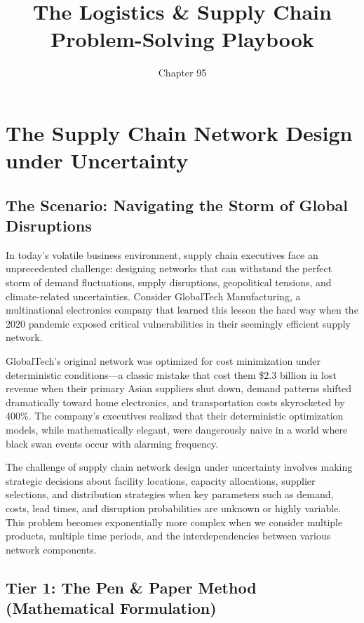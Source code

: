 \documentclass{article}
\title{The Logistics \& Supply Chain Problem-Solving Playbook}
\author{Chapter 95}
\date{}
\begin{document}
\maketitle

\section{The Supply Chain Network Design under Uncertainty}

\subsection{The Scenario: Navigating the Storm of Global Disruptions}

In today's volatile business environment, supply chain executives face an unprecedented challenge: designing networks that can withstand the perfect storm of demand fluctuations, supply disruptions, geopolitical tensions, and climate-related uncertainties. Consider GlobalTech Manufacturing, a multinational electronics company that learned this lesson the hard way when the 2020 pandemic exposed critical vulnerabilities in their seemingly efficient supply network.

GlobalTech's original network was optimized for cost minimization under deterministic conditions---a classic mistake that cost them \$2.3 billion in lost revenue when their primary Asian suppliers shut down, demand patterns shifted dramatically toward home electronics, and transportation costs skyrocketed by 400\%. The company's executives realized that their deterministic optimization models, while mathematically elegant, were dangerously naive in a world where black swan events occur with alarming frequency.

The challenge of supply chain network design under uncertainty involves making strategic decisions about facility locations, capacity allocations, supplier selections, and distribution strategies when key parameters such as demand, costs, lead times, and disruption probabilities are unknown or highly variable. This problem becomes exponentially more complex when we consider multiple products, multiple time periods, and the interdependencies between various network components.

\subsection{Tier 1: The Pen \& Paper Method (Mathematical Formulation)}
\end{document}
